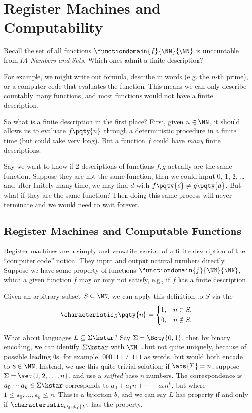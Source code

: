 \section{Register Machines and Computability}

Recall the set of all functions \(\functiondomain{f}{\NN}{\NN}\) is uncountable from \textit{IA Numbers and Sets}. Which ones admit a finite description?

For example, we might write out formula, describe in words (e.g. the \(n\)-th prime), or a computer code that evaluates the function. This means we can only describe countably many functions, and most functions would not have a finite description.

So what is a finite description in the first place? First, given \(n \in \NN\), it should allows us to evaluate \(f\pqty{n}\) through a deterministic procedure in a finite time (but could take very long). But a function \(f\) could have \emph{many} finite descriptions.

Say we want to know if 2 descriptions of functions \(f, g\) actually are the same function. Suppose they are not the same function, then we could input \(0\), \(1\), \(2\), \dots and after finitely many time, we may find \(d\) with \(f\pqty{d} \neq g\pqty{d}\). But what if they are the same function? Then doing this same process will never terminate and we would need to wait forever.

\subsection{Register Machines and Computable Functions}

Register machines are a simply and versatile version of a finite description of the ``computer code'' notion. They input and output natural numbers directly. Suppose we have some property of functions \(\functiondomain{f}{\NN}{\NN}\), which a given function \(f\) may or may not satisfy, e.g., if \(f\) has a finite description.

Given an arbitrary subset \(S \subseteq \NN\), we can apply this definition to \(S\) via the 
\[
    \characteristic_S \pqty{n} = \begin{cases}
        1, & n \in S,\\
        0, & n \notin S.
    \end{cases}
\]

What about languages \(L \subseteq \Sigma\kstar\)? Say \(\Sigma = \Bqty{0, 1}\), then by binary encoding, we can identify \(\Sigma\kstar\) with \(\NN\) \dots but not quite uniquely, because of possible leading \(0\)s, for example, \(000111 \neq 111\) as words, but would both encode to \(8 \in \NN\). Instead, we use this quite trivial solution: if \(\abs{\Sigma} = n\), suppose \(\Sigma = \set{1, 2, \ldots, n}\), and use a \emph{shifted} base \(n\) numbers. The correspondence is \(a_0 \cdots a_k \in \Sigma\kstar\) corresponds to \(a_0 + a_1 n + \cdots + a_k n^k\), but where \(1 \leq a_0, \ldots, a_k \leq n\). This is a bijection \(b\), and we can say \(L\) has property if and only if \(\characteristic_{b\pqty{L}}\) has the property.

